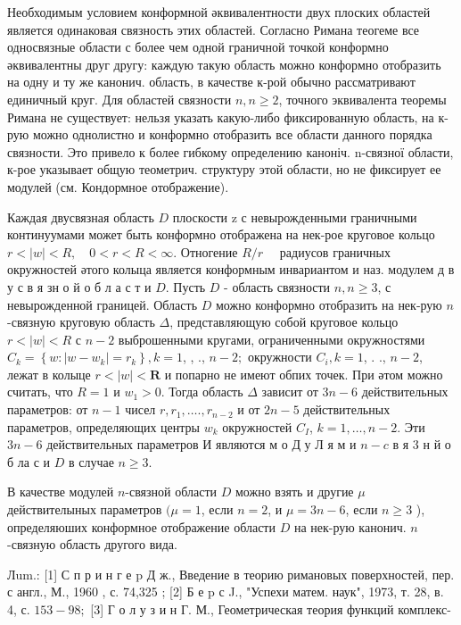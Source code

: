 \documentclass[10pt]{article}
\begin{document}
Необходимым условием конформной әквивалентности двух плоских областей является одинаковая связность этих областей. Согласно Римана теогеме все односвязные области с более чем одной граничной точкой конформно әквивалентны друг другу: каждую такую область можно конформно отобразить на одну и ту же канонич. область, в качестве к-рой обычно рассматривают единичный круг. Для областей связности $n, n \geqslant 2$, точного эквивалента теоремы Римана не существует: нельзя указать какую-либо фиксированную область, на к-рую можно однолистно и конформно отобразить все области данного порядка связности. Это привело к более гибкому определению каноніч. n-связної области, к-рое указывает общую теометрич. структуру этой области, но не фиксирует ее модулей (см. Кондормное отображение).



Каждая двусвязная область $D$ плоскости z с невырожденными граничными континуумами может быть конформно отображена на нек-рое круговое кольцо $r<|w|<R, \quad 0<r<R<\infty$. Отногение $R / r \quad$ радиусов граничных окружностей әтого колыца является конформным инвариантом и наз. модулем д в у с в я зн о й о б л а с т и $D$. Пусть $D$ - область связности $n, n \geqslant 3$, с невырожденной границей. Область $D$ можно конформно отобразить на нек-рую $n$-связную круговую область $\Delta$, представляющую собой круговое кольцо $r<|w|<R$ с $n-2$ выброшенными кругами, ограниченными окружностями $C_{k}=\left\{w:\left|w-w_{k}\right|=r_{k}\right\}, k=1$, , ., $n-2 ;$ окружности $C_{i}, k=1$, . ., $n-2$, лежат в колыце $r<|w|<\boldsymbol{R}$ и попарно не имеют обпих точек. При әтом можно считать, что $R=1$ и $w_{1}>0$. Тогда область $\Delta$ зависит от $3 n-6$ действительных параметров: от $n-1$ чисел $r, r_{1}, \ldots ., r_{n-2}$ и от $2 n-5$ действительных параметров, определяющих центры $w_{k}$ окружностей $C_{I}$, $k=1, \ldots, n-2$. Эти $3 n-6$ действительных параметров И являются м о Д у Л я м и $n-c$ в я 3 н й о б ла с и $D$ в случае $n \geqslant 3$.



В качестве модулей $n$-связной области $D$ можно взять и другие $\mu$ действителыных параметров $(\mu=1$, если $n=2$, и $\mu=3 n-6$, если $n \geqslant 3$ ), определяюших конформное отображение области $D$ на нек-рую канонич. $n$-связную область другого вида.



Лum.: [1] С п р и н г е p Д ж., Введение в теорию римановых поверхностей, пер. с англ., М., 1960 , с. 74,325 ; [2] Б е p с J., "Успехи матем. наук", 1973, т. 28, в. 4, с. $153-98 ;$ [3] Г о л у з и н Г. М., Геометрическая теория функций комплекс-
\end{document}
